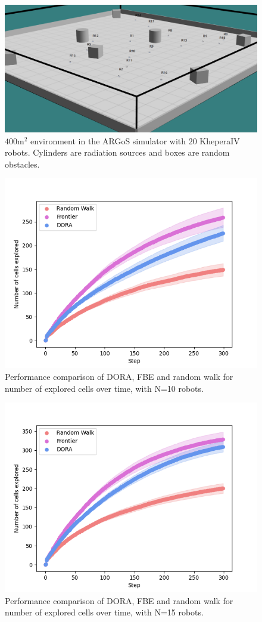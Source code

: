 \begin{figure}[htbp]
	\centering
    \includegraphics[width=\columnwidth]{images/argos.png}
    \caption{$400 \text{m}^2$ environment in the ARGoS simulator with 20 KheperaIV robots. Cylinders are radiation sources and boxes are random obstacles.}
    \label{argos}
\end{figure}

\label{annexe: results}

\begin{figure}[htbp]
	\centering
    \includegraphics[width=0.53\columnwidth]{images/explored_10.png}
    \caption{Performance comparison of DORA, FBE and random walk for number of explored cells over time, with N=10 robots.}
    \label{results:explored10}
\end{figure}

\begin{figure}[htbp]
	\centering
    \includegraphics[width=0.53\columnwidth]{images/explored_15.png}
    \caption{Performance comparison of DORA, FBE and random walk for number of explored cells over time, with N=15 robots.}
    \label{results:explored15}
\end{figure}

